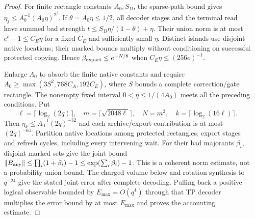 \begin{proof}
For finite rectangle constants $A_0,S_D$, the sparse-path bound gives
$\eta_j\le A_0^{-1}(A_0\eta)^{2^j}$.
If $\theta=A_0\eta\le1/2$, all decoder stages and the terminal read have
summed bad strength
$t\le S_D\eta/(1-\theta)+\eta$.
Their union norm is at most $e^t-1\le C_E\eta$ for a fixed $C_E$ and
sufficiently small $\eta$. Distinct islands use disjoint native locations;
their marked bounds multiply without conditioning on successful protected
copying. Hence $\beta_{\rm export}\le e^{-N/8}$ when
$C_E\eta\le(256e)^{-1}$.

Enlarge $A_0$ to absorb the finite native constants and require
$A_0\ge\max(3S^2,768C_A,192C_E)$, where $S$ bounds a complete
correction/gate rectangle. The nonempty fixed interval
$0<\eta\le1/(4A_0)$ meets all the preceding conditions. Put
\[
 \ell=\lceil\log_2(2q)\rceil,\quad
 m=\lceil\sqrt{2048\ell}\rceil,\quad N=m^2,\quad
 k=\lceil\log_2(16\ell)\rceil.
\]
Then $\eta_k\le A_0^{-1}(2q)^{-32}$ and each archive/export contribution
is at most $(2q)^{-64}$. Partition native locations among protected
rectangles, export stages and refresh cycles, including every intervening
wait. For their bad majorants $\beta_i$, disjoint marked sets give the
joint bound $\|B_{\rm any}\|\le\prod_i(1+\beta_i)-1
\le\exp(\sum_i\beta_i)-1$.
This is a coherent norm estimate, not a probability union bound.
The charged volume below and rotation synthesis to $q^{-24}$ give the
stated joint error after complete decoding. Pulling back a positive logical
observable bounded by $E_{\max}=O(q^4)$ through that TP decoder multiplies
the error bound by at most $E_{\max}$ and proves the accounting estimate.
\end{proof}


